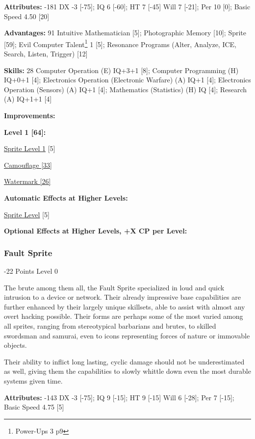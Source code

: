 \begin{multicols*}{3}
\textbf{Attributes:} -181
DX -3 [-75]; IQ 6 [-60]; HT 7 [-45]
Will 7 [-21]; Per 10 [0]; Basic Speed 4.50 [20]

\textbf{Advantages:} 91
Intuitive Mathematician [5]; Photographic Memory [10]; Sprite [59]; Evil Computer Talent\footnote{Power-Ups 3 p9} 1 [5]; Resonance Programs (Alter, Analyze, ICE, Search, Listen, Trigger) [12]

\textbf{Skills:} 28
Computer Operation (E) IQ+3+1 [8]; Computer Programming (H) IQ+0+1 [4]; Electronics Operation (Electronic Warfare) (A) IQ+1 [4]; Electronics Operation (Sensors) (A) IQ+1 [4]; Mathematics (Statistics) (H) IQ [4]; Research (A) IQ+1+1 [4] 

\textbf{Improvements:}

\textbf{Level 1 [64]:}

\hyperref[sprite_level]{Sprite Level 1} [5]

\hyperref[camouflage]{Camouflage [33]}

\hyperref[watermark]{Watermark [26]}

\textbf{Automatic Effects at Higher Levels:}

\hyperref[sprite_level]{Sprite Level} [5]

\textbf{Optional Effects at Higher Levels, +X CP per Level:}


\subsubsection{Fault Sprite}
\begin{flushright}
	-22 Points Level 0
\end{flushright}

The brute among them all, the Fault Sprite specialized in loud and quick intrusion to a device or network. Their already impressive base capabilities are further enhanced by their largely unique skillsets, able to assist with almost any overt hacking possible. Their forms are perhaps some of the most varied among all sprites, ranging from stereotypical barbarians and brutes, to skilled swordsman and samurai, even to icons representing forces of nature or immovable objects.

Their ability to inflict long lasting, cyclic damage should not be underestimated as well, giving them the capabilities to slowly whittle down even the most durable systems given time.

\textbf{Attributes:} -143
DX -3 [-75]; IQ 9 [-15]; HT 9 [-15]
Will 6 [-28]; Per 7 [-15]; Basic Speed 4.75 [5]


\end{multicols*}
